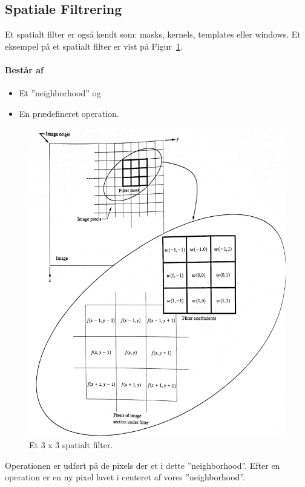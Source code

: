 \subsection{Spatiale Filtrering}
Et spatialt filter er også kendt som: masks, kernels, templates eller windows. Et eksempel på et spatialt filter er vist på Figur~\ref{fig:spatial-filter}.\\

\paragraph{Består af}

\begin{itemize}
	\item Et ''neighborhood'' og 
	\item En prædefineret operation.
\end{itemize}

\begin{figure}[H]
	\centering
	\includegraphics[width=0.8\linewidth]{figs/spm02/spatial-filter}
	\caption{Et 3 x 3 spatialt filter.}
	\label{fig:spatial-filter}
\end{figure}

Operationen er udført på de pixels der et i dette ''neighborhood''. Efter en operation er en ny pixel lavet i centeret af vores ''neighborhood''.

